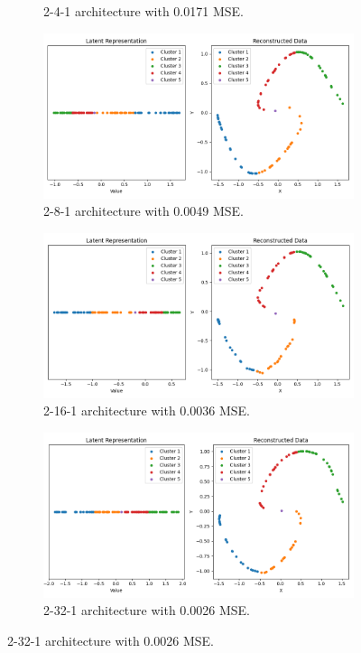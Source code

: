 \begin{figure}[htb]
\begin{subfigure}[b]{0.49\textwidth}
    \caption{2-4-1 architecture with 0.0171 MSE.}
    \label{fig:2-4-1}
  \end{subfigure}
  \hfill
  \begin{subfigure}[b]{0.49\textwidth}
    \centering
    \includegraphics[width=\linewidth]{images/RQ1/2-8-1_0.0049.png}
    \caption{2-8-1 architecture with 0.0049 MSE.}
    \label{fig:2-8-1}
  \end{subfigure}
  \hfill
  \begin{subfigure}[b]{0.49\textwidth}
    \centering
    \includegraphics[width=\linewidth]{images/RQ1/2-16-1_0.0036.png}
    \caption{2-16-1 architecture with 0.0036 MSE.}
    \label{fig:2-16-1}
  \end{subfigure}
  \hfill
  \begin{subfigure}[b]{0.49\textwidth}
    \centering
    \includegraphics[width=\linewidth]{images/RQ1/2-32-1_0.0026.png}
    \caption{2-32-1 architecture with \textcolor{green!20!black}{0.0026} MSE.}
    \label{fig:2-32-1}
  \end{subfigure}


\end{figure}
